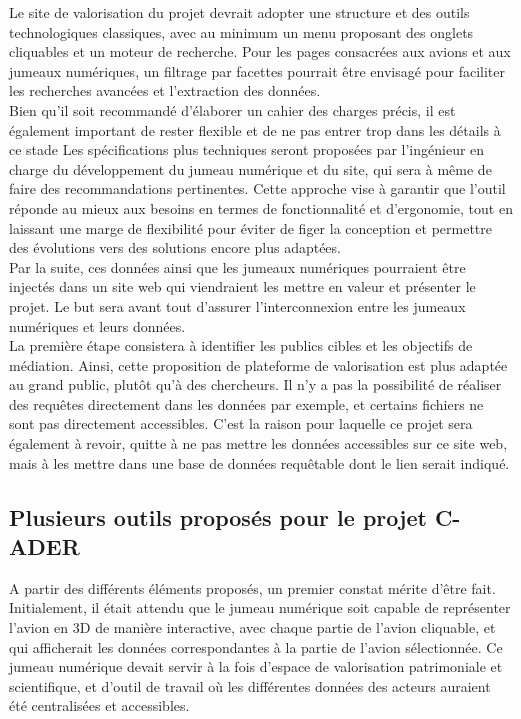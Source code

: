 Le site de valorisation du projet devrait adopter une structure et des outils technologiques classiques, avec au minimum un menu proposant des onglets cliquables et un moteur de recherche. Pour les pages consacrées aux avions et aux jumeaux numériques, un filtrage par facettes pourrait être envisagé pour faciliter les recherches avancées et l’extraction des données.\\
 
Bien qu’il soit recommandé d’élaborer un cahier des charges précis, il est également important de rester flexible et de ne pas entrer trop dans les détails à ce stade Les spécifications plus techniques seront proposées par l’ingénieur en charge du développement du jumeau numérique et du site, qui sera à même de faire des recommandations pertinentes. Cette approche vise à garantir que l’outil réponde au mieux aux besoins en termes de fonctionnalité et d’ergonomie, tout en laissant une marge de flexibilité pour éviter de figer la conception et permettre des évolutions vers des solutions encore plus adaptées.\\

Par la suite, ces données ainsi que les jumeaux numériques pourraient être injectés dans un site web qui viendraient les mettre en valeur et présenter le projet. Le but sera avant tout d’assurer l’interconnexion entre les jumeaux numériques et leurs données.\\

La première étape consistera à identifier les publics cibles et les objectifs de médiation. Ainsi, cette proposition de plateforme de valorisation est plus adaptée au grand public, plutôt qu’à des chercheurs. Il n’y a pas la possibilité de réaliser des requêtes directement dans les données par exemple, et certains fichiers ne sont pas directement accessibles. C’est la raison pour laquelle ce projet sera également à revoir, quitte à ne pas mettre les données accessibles sur ce site web, mais à les mettre dans une base de données requêtable dont le lien serait indiqué.

        \subsection{Plusieurs outils proposés pour le projet C-ADER}
        
A partir des différents éléments proposés, un premier constat mérite d'être fait. Initialement, il était attendu que le jumeau numérique soit capable de représenter l'avion en 3D de manière interactive, avec chaque partie de l'avion cliquable, et qui afficherait les données correspondantes à la partie de l’avion sélectionnée. Ce jumeau numérique devait servir à la fois d’espace de valorisation patrimoniale et scientifique, et d’outil de travail où les différentes données des acteurs auraient été centralisées et accessibles.\\

